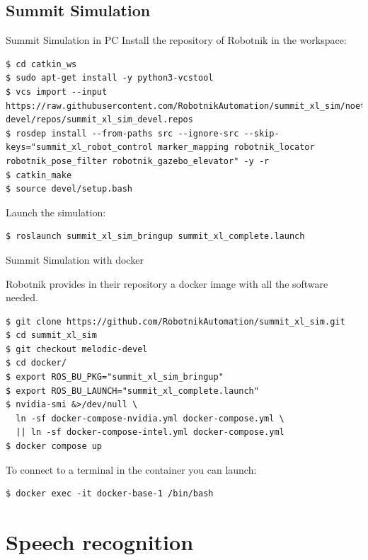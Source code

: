 \subsection{Summit Simulation}

\begin{frame}[fragile]{Summit Simulation in PC}
Install the repository of Robotnik in the workspace:
\begin{lstlisting}[language=shell]
$ cd catkin_ws
$ sudo apt-get install -y python3-vcstool
$ vcs import --input https://raw.githubusercontent.com/RobotnikAutomation/summit_xl_sim/noetic-devel/repos/summit_xl_sim_devel.repos
$ rosdep install --from-paths src --ignore-src --skip-keys="summit_xl_robot_control marker_mapping robotnik_locator robotnik_pose_filter robotnik_gazebo_elevator" -y -r
$ catkin_make
$ source devel/setup.bash
\end{lstlisting}

Launch the simulation:
\begin{lstlisting}[language=shell]
$ roslaunch summit_xl_sim_bringup summit_xl_complete.launch
\end{lstlisting}
\end{frame}

\begin{frame}[fragile]{Summit Simulation with docker}

Robotnik provides in their repository a docker image with all the software needed.

\begin{lstlisting}[language=shell]
$ git clone https://github.com/RobotnikAutomation/summit_xl_sim.git
$ cd summit_xl_sim
$ git checkout melodic-devel
$ cd docker/
$ export ROS_BU_PKG="summit_xl_sim_bringup"
$ export ROS_BU_LAUNCH="summit_xl_complete.launch"
$ nvidia-smi &>/dev/null \
  ln -sf docker-compose-nvidia.yml docker-compose.yml \
  || ln -sf docker-compose-intel.yml docker-compose.yml
$ docker compose up
\end{lstlisting}

To connect to a terminal in the container you can launch:
\begin{lstlisting}[language=shell]
$ docker exec -it docker-base-1 /bin/bash
\end{lstlisting}
\end{frame}


\section{Speech recognition}


